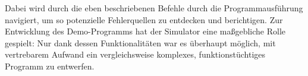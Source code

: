 Dabei wird durch die eben beschriebenen Befehle durch die Programmausf\"uhrung navigiert, um so potenzielle Fehlerquellen zu entdecken und berichtigen. Zur Entwicklung des Demo-Programms hat der Simulator eine ma\ss{}gebliche Rolle gespielt: Nur dank dessen Funktionalit\"aten war es \"uberhaupt m\"oglich, mit vertrebarem Aufwand ein vergleichsweise komplexes, funktionst\"uchtiges Programm zu entwerfen.

